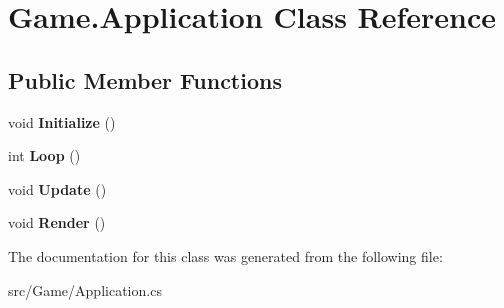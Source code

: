 \hypertarget{class_game_1_1_application}{}\section{Game.\+Application Class Reference}
\label{class_game_1_1_application}
\subsection*{Public Member Functions}
\begin{DoxyCompactItemize}
\item 
\mbox{\label{class_game_1_1_application_ac71b7eac1ed2ebc0d697d184428ca8e2}} 
void {\bfseries Initialize} ()
\item 
\mbox{\label{class_game_1_1_application_a53632a28eda450a69ad128d4914b56bf}} 
int {\bfseries Loop} ()
\item 
\mbox{\label{class_game_1_1_application_a2ea7c18c0ee837403f7e8d4afeef30bc}} 
void {\bfseries Update} ()
\item 
\mbox{\label{class_game_1_1_application_a147214be44408796042eb1245bbd7f63}} 
void {\bfseries Render} ()
\end{DoxyCompactItemize}


The documentation for this class was generated from the following file\+:\begin{DoxyCompactItemize}
\item 
src/\+Game/Application.\+cs\end{DoxyCompactItemize}
